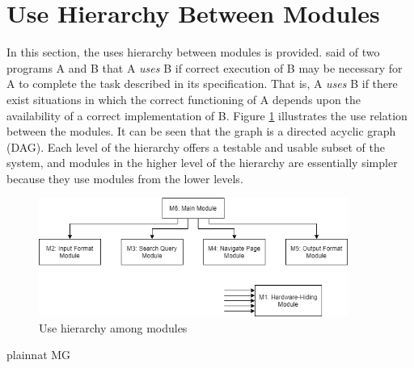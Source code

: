 \documentclass[12pt, titlepage]{article}
\begin{document}
\newpage

\section{Use Hierarchy Between Modules} \label{SecUse}

In this section, the uses hierarchy between modules is
provided. \citet{Parnas1978} said of two programs A and B that A {\em uses} B if
correct execution of B may be necessary for A to complete the task described in
its specification. That is, A {\em uses} B if there exist situations in which
the correct functioning of A depends upon the availability of a correct
implementation of B.  Figure \ref{FigUH} illustrates the use relation between
the modules. It can be seen that the graph is a directed acyclic graph
(DAG). Each level of the hierarchy offers a testable and usable subset of the
system, and modules in the higher level of the hierarchy are essentially simpler
because they use modules from the lower levels.

\begin{figure}[H]
\centering
\includegraphics[width=0.9\textwidth]{UsesHierarchy.png}
\caption{Use hierarchy among modules}
\label{FigUH}
\end{figure}


 {plainnat}
 {MG}
\end{document}
